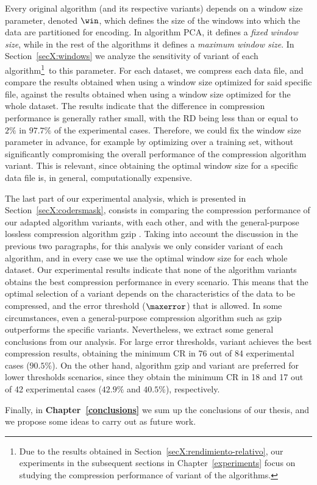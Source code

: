\newcommand{\footSupportFocus}{\footnote{\label{note1}Due to the results obtained in Section~\ref{secX:rendimiento-relativo}, our experiments in the subsequent sections in Chapter~\ref{experiments} focus on studying the compression performance of variant \maskalgo of the algorithms.}}


Every original algorithm (and its respective variants) depends on a window size parameter, denoted $\win$, which defines the size of the windows into which the data are partitioned for encoding. In algorithm PCA, it defines a \textit{fixed window size}, while in the rest of the algorithms it defines a \textit{maximum window size}. In Section~\ref{secX:windows} we analyze the sensitivity of variant \maskalgo of each algorithm\footSupportFocus\ to this parameter. For each dataset, we compress each data file, and compare the results obtained when using a window size optimized for said specific file, against the results obtained when using a window size optimized for the whole dataset. The results indicate that the difference in compression performance is generally rather small, with the RD being less than or equal to $2\%$ in $97.7\%$ of the experimental cases. Therefore, we could fix the window size parameter in advance, for example by optimizing over a training set, without significantly compromising the overall performance of the compression algorithm variant. This is relevant, since obtaining the optimal window size for a specific data file is, in general, computationally expensive.


The last part of our experimental analysis, which is presented in Section~\ref{secX:codersmask}, consists in comparing the compression performance of our adapted algorithm variants, with each other, and with the general-purpose lossless compression algorithm gzip \cite{gzip}. Taking into account the discussion in the previous two paragraphs, for this analysis we only consider variant \maskalgo of each algorithm, and in every case we use the optimal window size for each whole dataset. Our experimental results indicate that none of the algorithm variants obtains the best compression performance in every scenario. This means that the optimal selection of a variant depends on the characteristics of the data to be compressed, and the error threshold ($\maxerror$) that is allowed. In some circumstances, even a general-purpose compression algorithm such as gzip outperforms the specific variants. Nevertheless, we extract some general conclusions from our analysis. For large error thresholds, variant  achieves the best compression results, obtaining the minimum CR in 76 out of 84 experimental cases ($90.5\%$). On the other hand, algorithm gzip and variant  are preferred for lower thresholds scenarios, since they obtain the minimum CR in 18 and 17 out of 42 experimental cases ($42.9\%$ and $40.5\%$), respectively.


Finally, in \textbf{Chapter~\ref{conclusions}} we sum up the conclusions of our thesis, and we propose some ideas to carry out as future work.

